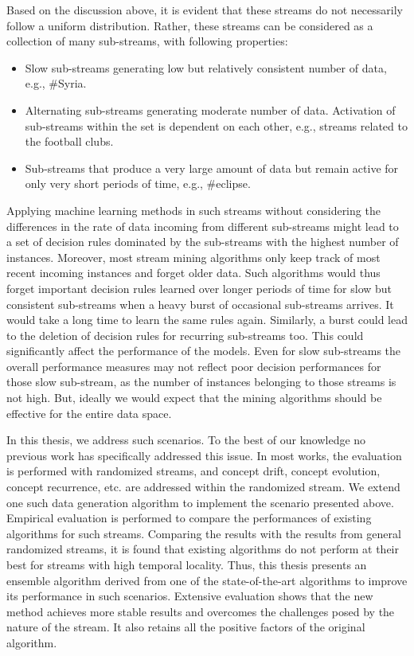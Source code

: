 Based on the discussion above, it is evident that these streams do not necessarily follow a uniform distribution. Rather, these streams can be considered as a collection of many sub-streams, with following properties:
\begin{itemize}
    \item Slow sub-streams generating low but relatively consistent number of data, e.g., \#Syria.
    \item Alternating sub-streams generating moderate number of data. Activation of sub-streams within the set is dependent on each other, e.g., streams related to the football clubs.
    \item Sub-streams that produce a very large amount of data but remain active for only very short periods of time, e.g., \#eclipse.
\end{itemize}

Applying machine learning methods in such streams without considering the differences in the rate of data incoming from different sub-streams might lead to a set of decision rules dominated by the sub-streams with the highest number of instances. Moreover, most stream mining algorithms only keep track of most recent incoming instances and forget older data. Such algorithms would thus forget important decision rules learned over longer periods of time for slow but consistent sub-streams when a heavy burst of occasional sub-streams arrives. It would take a long time to learn the same rules again. Similarly, a burst could lead to the deletion of decision rules for recurring sub-streams too. This could significantly affect the performance of the models. Even for slow sub-streams the overall performance measures may not reflect poor decision performances for those slow sub-stream, as the number of instances belonging to those streams is not high. But, ideally we would expect that the mining algorithms should be effective for the entire data space.

In this thesis, we address such scenarios. To the best of our knowledge no previous work has specifically addressed this issue. In most works, the evaluation is performed with randomized streams, and concept drift, concept evolution, concept recurrence, etc. are addressed within the randomized stream. We extend one such data generation algorithm to implement the scenario presented above. Empirical evaluation is performed to compare the performances of existing algorithms for such streams. Comparing the results with the results from general randomized streams, it is found that existing algorithms do not perform at their best for streams with high temporal locality. Thus, this thesis presents an ensemble algorithm derived from one of the state-of-the-art algorithms to improve its performance in such scenarios. Extensive evaluation shows that the new method achieves more stable results and overcomes the challenges posed by the nature of the stream. It also retains all the positive factors of the original algorithm.


